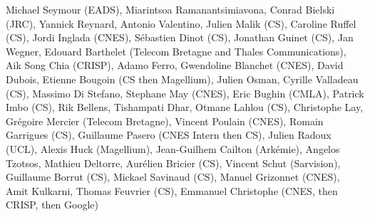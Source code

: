 Michael Seymour (EADS), Miarintsoa Ramanantsimiavona, Conrad Bielski (JRC), Yannick Reynard, Antonio Valentino, Julien Malik (CS), Caroline Ruffel (CS), Jordi Inglada (CNES), S\'ebastien Dinot (CS), Jonathan Guinet (CS), Jan Wegner, Edouard Barthelet (Telecom Bretagne and Thales Communications), Aik Song Chia (CRISP), Adamo Ferro, Gwendoline Blanchet (CNES), David Dubois, Etienne Bougoin (CS then Magellium), Julien Osman, Cyrille Valladeau (CS), Massimo Di Stefano, Stephane May (CNES), Eric Bughin (CMLA), Patrick Imbo (CS), Rik Bellens, Tishampati Dhar, Otmane Lahlou (CS), Christophe Lay, Gr\'egoire Mercier (Telecom Bretagne), Vincent Poulain (CNES), Romain Garrigues (CS), Guillaume Pasero (CNES Intern then CS), Julien Radoux (UCL), Alexis Huck (Magellium), Jean-Guilhem Cailton (Ark\'emie), Angelos Tzotsos, Mathieu Deltorre, Aur\'elien Bricier (CS), Vincent Schut (Sarvision), Guillaume Borrut (CS), Mickael Savinaud (CS), Manuel Grizonnet (CNES), Amit Kulkarni, Thomas Feuvrier (CS), Emmanuel Christophe (CNES, then CRISP, then Google)
